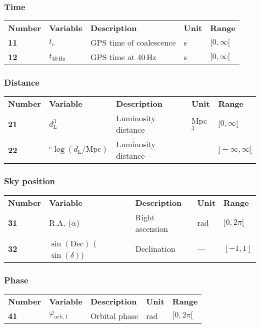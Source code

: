 \documentclass[11pt]{article}
\begin{document}
\subsubsection{Time}
\begin{tabular}{lllll}
  \textbf{Number} & \textbf{Variable} & \textbf{Description} & \textbf{Unit} & \textbf{Range} \\
  \textbf{11} & $t_\mathrm{c}$        & GPS time of coalescence & s & $[0,\infty[$ \\
  \textbf{12} & $t_\mathrm{40\,Hz}$   & GPS time at 40\,Hz & s & $[0,\infty[$ \\
\end{tabular}

\subsubsection{Distance}
\begin{tabular}{lllll}
  \textbf{Number} & \textbf{Variable} & \textbf{Description} & \textbf{Unit} & \textbf{Range} \\
  \textbf{21} & $d_\mathrm{L}^3$ & Luminosity distance & Mpc$^3$ & $]0,\infty[$ \\
  \textbf{22} & $^\mathrm{e}\log(d_\mathrm{L}/\mathrm{Mpc})$ & Luminosity distance & --- & $]-\infty,\infty[$ \\
\end{tabular}

\subsubsection{Sky position}
\begin{tabular}{lllll}
  \textbf{Number} & \textbf{Variable} & \textbf{Description} & \textbf{Unit} & \textbf{Range} \\
  \textbf{31} & R.A. ($\alpha$)  & Right ascension & rad & $[0,2\pi[$ \\
  \textbf{32} & $\sin(\mathrm{Dec})$ ($\sin(\delta)$)  & Declination & --- & $[-1,1]$ \\
\end{tabular}


\subsubsection{Phase}
\begin{tabular}{lllll}
  \textbf{Number} & \textbf{Variable} & \textbf{Description} & \textbf{Unit} & \textbf{Range} \\
  \textbf{41} & $\varphi_\mathrm{orb,1}$  & Orbital phase & rad & $[0,2\pi[$ \\
\end{tabular}
\end{document}
